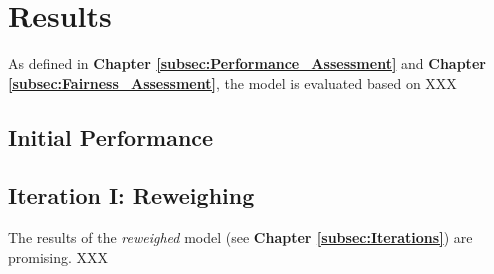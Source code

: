 \section{Results}\label{sec:Results}        

As defined in \textbf{Chapter \ref{subsec:Performance_Assessment}} and \textbf{Chapter \ref{subsec:Fairness_Assessment}}, the model is evaluated based on XXX



\subsection{Initial Performance}\label{subsec:Initial_Performance}


\subsection{Iteration I: Reweighing}\label{subsec:Iteration_I}

The results of the \textit{reweighed} model (see \textbf{Chapter \ref{subsec:Iterations}}) are promising. XXX


